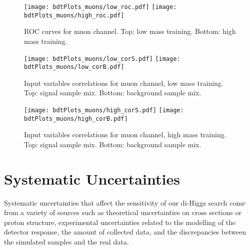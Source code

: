 \begin{figure}[tbp]
  \begin{center}
   \texttt{[image: bdtPlots\_muons/low\_roc.pdf]}
   \texttt{[image: bdtPlots\_muons/high\_roc.pdf]}
    \caption{ ROC curves for muon channel. Top: low mass training. Bottom: high mass training. }
    \label{fig:muon_ROCs}
  \end{center}
\end{figure}

\begin{figure}[tbp]
  \begin{center}
   \texttt{[image: bdtPlots\_muons/low\_corS.pdf]}
   \texttt{[image: bdtPlots\_muons/low\_corB.pdf]}
    \caption{ Input variables correlations for muon channel, low mass training. Top: signal sample mix. Bottom: background sample mix. }
    \label{fig:muon_cors_low}
  \end{center}
\end{figure}


\begin{figure}[tbp]
  \begin{center}
   \texttt{[image: bdtPlots\_muons/high\_corS.pdf]}
   \texttt{[image: bdtPlots\_muons/high\_corB.pdf]}
    \caption{ Input variables correlations for muon channel, high mass training. Top: signal sample mix. Bottom: background sample mix. }
    \label{fig:muon_cors_high}
  \end{center}
\end{figure}













\section{Systematic Uncertainties}
\label{sec:Systematics}

Systematic uncertainties that affect the sensitivity of our di-Higgs search
come from a variety of sources such as theoretical uncertainties on
cross sections or proton structure, experimental uncertainties related
to the modelling of the detector response, the amount of collected
data, and the discrepancies between the simulated samples and the real data.

